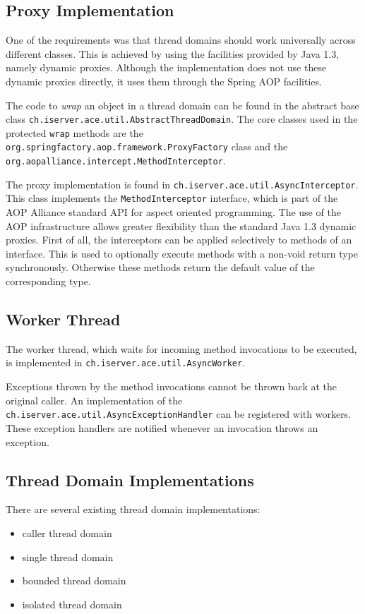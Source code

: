 \subsection{Proxy Implementation}
One of the requirements was that thread domains should work universally across
different classes. This is achieved by using the facilities provided by
Java 1.3, namely dynamic proxies. Although the implementation does not use
these dynamic proxies directly, it uses them through the Spring AOP facilities.

The code to \emph{wrap} an object in a thread domain can be found in the
abstract base class \texttt{ch.iserver.ace.util.AbstractThreadDomain}. The
core classes used in the protected \texttt{wrap} methods are the
\texttt{org.springfactory.aop.framework.ProxyFactory} class and the 
\texttt{org.aopalliance.intercept.MethodInterceptor}. 

The proxy implementation is found in 
\texttt{ch.iserver.ace.util.AsyncInterceptor}. This class implements the
\texttt{MethodInterceptor} interface, which is part of the AOP Alliance
standard API for aspect oriented programming. The use of the AOP 
infrastructure allows greater flexibility than the standard Java 1.3 dynamic
proxies. First of all, the interceptors can be applied selectively to
methods of an interface. This is used to optionally execute methods with 
a non-void return type synchronously. Otherwise these methods return
the default value of the corresponding type.


\subsection{Worker Thread}
The worker thread, which waits for incoming method invocations to be
executed, is implemented in \texttt{ch.iserver.ace.util.AsyncWorker}.

Exceptions thrown by the method invocations cannot be thrown back at the
original caller. An implementation of the 
\texttt{ch.iserver.ace.util.AsyncExceptionHandler} can be registered with
workers. These exception handlers are notified whenever an invocation
throws an exception.


\subsection{Thread Domain Implementations}
There are several existing thread domain implementations:
\begin{itemize}
 \item caller thread domain
 \item single thread domain
 \item bounded thread domain
 \item isolated thread domain
\end{itemize}

